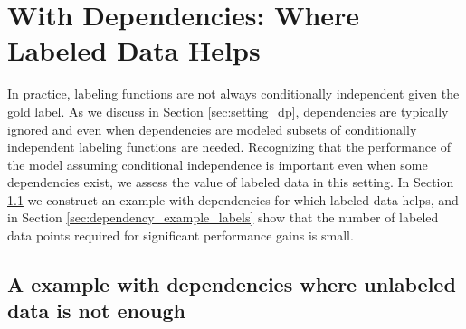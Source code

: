 \section{With Dependencies: Where Labeled Data Helps}
\label{sec:misspecification}

In practice, labeling functions are not always conditionally independent given the gold label. As we discuss in Section \ref{sec:setting_dp}, dependencies are typically ignored and even when dependencies are modeled subsets of conditionally independent labeling functions are needed. Recognizing that the performance of the model assuming conditional independence is important even when some dependencies exist, we assess the value of labeled data in this setting. In Section \ref{sec:dependency_example} we construct an example with dependencies for which labeled data helps, and in Section \ref{sec:dependency_example_labels} show that the number of labeled data points required for significant performance gains is small.

\subsection{A example with dependencies where unlabeled data is not enough}
\label{sec:dependency_example}


